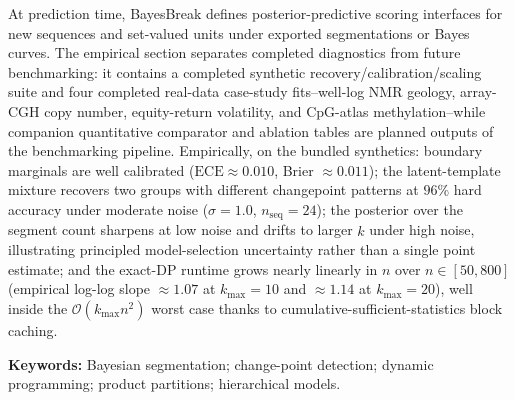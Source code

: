 {At prediction time, BayesBreak defines posterior-predictive scoring interfaces for new sequences and set-valued units under exported segmentations or Bayes curves. The empirical section separates completed diagnostics from future benchmarking: it contains a completed synthetic recovery/calibration/scaling suite and four completed real-data case-study fits--well-log NMR geology, array-CGH copy number, equity-return volatility, and CpG-atlas methylation--while companion quantitative comparator and ablation tables are planned outputs of the benchmarking pipeline. Empirically, on the bundled synthetics: boundary marginals are well calibrated ($\mathrm{ECE}\approx 0.010$, Brier $\approx 0.011$); the latent-template mixture recovers two groups with different changepoint patterns at $96\%$ hard accuracy under moderate noise ($\sigma=1.0$, $n_{\mathrm{seq}}=24$); the posterior over the segment count sharpens at low noise and drifts to larger $\hat k$ under high noise, illustrating principled model-selection uncertainty rather than a single point estimate; and the exact-DP runtime grows nearly linearly in $n$ over $n\in[50,800]$ (empirical log-log slope $\approx 1.07$ at $k_{\max}=10$ and $\approx 1.14$ at $k_{\max}=20$), well inside the $\mathcal{O}(k_{\max}n^2)$ worst case thanks to cumulative-sufficient-statistics block caching.

\smallskip\noindent\textbf{Keywords:} Bayesian segmentation; change-point detection; dynamic programming; product partitions; hierarchical models.
}
